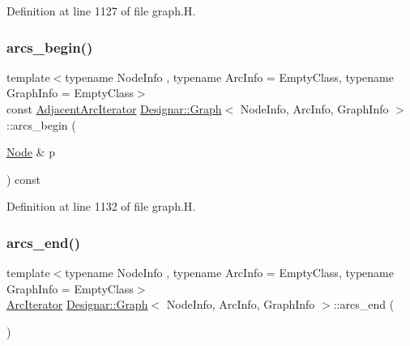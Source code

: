 Definition at line 1127 of file graph.\+H.

\mbox{\label{class_designar_1_1_graph_a2c527f6bddb0ff454fd6139f2437c27b}} 
\subsubsection{\texorpdfstring{arcs\+\_\+begin()}{arcs\_begin()}\hspace{0.1cm}{\footnotesize\ttfamily [4/4]}}
{\footnotesize\ttfamily template$<$typename Node\+Info , typename Arc\+Info  = Empty\+Class, typename Graph\+Info  = Empty\+Class$>$ \\
const \hyperlink{class_designar_1_1_graph_1_1_adjacent_arc_iterator}{Adjacent\+Arc\+Iterator} \hyperlink{class_designar_1_1_graph}{Designar\+::\+Graph}$<$ Node\+Info, Arc\+Info, Graph\+Info $>$\+::arcs\+\_\+begin (\begin{DoxyParamCaption}\item[{\hyperlink{class_designar_1_1_graph_a5dfc7dba9d092ac489c72e40390c37d0}{Node} \&}]{p }\end{DoxyParamCaption}) const\hspace{0.3cm}{\ttfamily [inline]}}



Definition at line 1132 of file graph.\+H.

\mbox{\label{class_designar_1_1_graph_a57a43c94f28df5958e912554d640bdaa}} 
\subsubsection{\texorpdfstring{arcs\+\_\+end()}{arcs\_end()}\hspace{0.1cm}{\footnotesize\ttfamily [1/4]}}
{\footnotesize\ttfamily template$<$typename Node\+Info , typename Arc\+Info  = Empty\+Class, typename Graph\+Info  = Empty\+Class$>$ \\
\hyperlink{class_designar_1_1_graph_1_1_arc_iterator}{Arc\+Iterator} \hyperlink{class_designar_1_1_graph}{Designar\+::\+Graph}$<$ Node\+Info, Arc\+Info, Graph\+Info $>$\+::arcs\+\_\+end (\begin{DoxyParamCaption}{ }\end{DoxyParamCaption})\hspace{0.3cm}{\ttfamily [inline]}}



